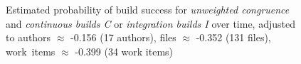\begin{figure}
{     \label{subfig:prob_unweighted_age_typeci_q025}
  }
  
	\caption{Estimated probability of build success for \emph{unweighted congruence} and \emph{continuous builds C} or \emph{integration builds I}  over time, adjusted to authors $\approx$ -0.156 (17 authors), files $\approx$ -0.352 (131 files), work~items $\approx$ -0.399 (34 work items)}
	\label{fig:unweighted_congruence_typeci_age}
\end{figure}

